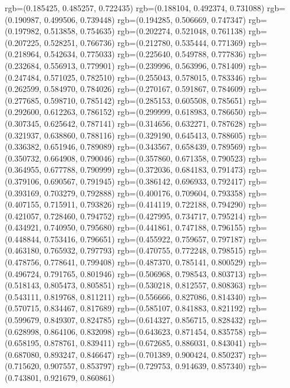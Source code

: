 {{{					rgb=(0.185425, 0.485257, 0.722435)
					rgb=(0.188104, 0.492374, 0.731088)
					rgb=(0.190987, 0.499506, 0.739448)
					rgb=(0.194285, 0.506669, 0.747347)
					rgb=(0.197982, 0.513858, 0.754635)
					rgb=(0.202274, 0.521048, 0.761138)
					rgb=(0.207225, 0.528251, 0.766736)
					rgb=(0.212780, 0.535444, 0.771369)
					rgb=(0.218964, 0.542634, 0.775033)
					rgb=(0.225640, 0.549788, 0.777836)
					rgb=(0.232684, 0.556913, 0.779901)
					rgb=(0.239996, 0.563996, 0.781409)
					rgb=(0.247484, 0.571025, 0.782510)
					rgb=(0.255043, 0.578015, 0.783346)
					rgb=(0.262599, 0.584970, 0.784026)
					rgb=(0.270167, 0.591867, 0.784609)
					rgb=(0.277685, 0.598710, 0.785142)
					rgb=(0.285153, 0.605508, 0.785651)
					rgb=(0.292600, 0.612263, 0.786152)
					rgb=(0.299999, 0.618983, 0.786650)
					rgb=(0.307345, 0.625642, 0.787141)
					rgb=(0.314656, 0.632271, 0.787628)
					rgb=(0.321937, 0.638860, 0.788116)
					rgb=(0.329190, 0.645413, 0.788605)
					rgb=(0.336382, 0.651946, 0.789089)
					rgb=(0.343567, 0.658439, 0.789569)
					rgb=(0.350732, 0.664908, 0.790046)
					rgb=(0.357860, 0.671358, 0.790523)
					rgb=(0.364955, 0.677788, 0.790999)
					rgb=(0.372036, 0.684183, 0.791473)
					rgb=(0.379106, 0.690567, 0.791945)
					rgb=(0.386142, 0.696933, 0.792417)
					rgb=(0.393169, 0.703279, 0.792888)
					rgb=(0.400176, 0.709604, 0.793358)
					rgb=(0.407155, 0.715911, 0.793826)
					rgb=(0.414119, 0.722188, 0.794290)
					rgb=(0.421057, 0.728460, 0.794752)
					rgb=(0.427995, 0.734717, 0.795214)
					rgb=(0.434921, 0.740950, 0.795680)
					rgb=(0.441861, 0.747188, 0.796155)
					rgb=(0.448844, 0.753416, 0.796651)
					rgb=(0.455922, 0.759657, 0.797187)
					rgb=(0.463180, 0.765932, 0.797793)
					rgb=(0.470755, 0.772248, 0.798515)
					rgb=(0.478756, 0.778641, 0.799408)
					rgb=(0.487370, 0.785141, 0.800529)
					rgb=(0.496724, 0.791765, 0.801946)
					rgb=(0.506968, 0.798543, 0.803713)
					rgb=(0.518143, 0.805473, 0.805851)
					rgb=(0.530218, 0.812557, 0.808363)
					rgb=(0.543111, 0.819768, 0.811211)
					rgb=(0.556666, 0.827086, 0.814340)
					rgb=(0.570715, 0.834467, 0.817689)
					rgb=(0.585107, 0.841883, 0.821192)
					rgb=(0.599679, 0.849307, 0.824785)
					rgb=(0.614327, 0.856715, 0.828432)
					rgb=(0.628998, 0.864106, 0.832098)
					rgb=(0.643623, 0.871454, 0.835758)
					rgb=(0.658195, 0.878761, 0.839411)
					rgb=(0.672685, 0.886031, 0.843041)
					rgb=(0.687080, 0.893247, 0.846647)
					rgb=(0.701389, 0.900424, 0.850237)
					rgb=(0.715620, 0.907557, 0.853797)
					rgb=(0.729753, 0.914639, 0.857340)
					rgb=(0.743801, 0.921679, 0.860861)
}}}
